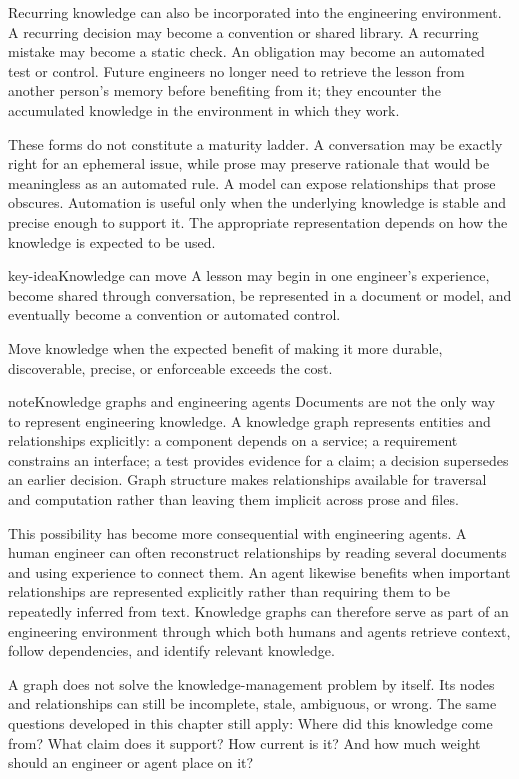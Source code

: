 Recurring knowledge can also be incorporated into the engineering environment. A recurring decision
may become a convention or shared library. A recurring mistake may become a static check. An
obligation may become an automated test or control. Future engineers no longer need to retrieve the
lesson from another person's memory before benefiting from it; they encounter the accumulated
knowledge in the environment in which they work.

These forms do not constitute a maturity ladder. A conversation may be exactly right for an
ephemeral issue, while prose may preserve rationale that would be meaningless as an automated rule.
A model can expose relationships that prose obscures. Automation is useful only when the underlying
knowledge is stable and precise enough to support it. The appropriate representation depends on how
the knowledge is expected to be used.

\begin{bookbox}{key-idea}{Knowledge can move} %
A lesson may begin in one engineer's experience, become shared through conversation, be represented
in a document or model, and eventually become a convention or automated control.

Move knowledge when the expected benefit of making it more durable, discoverable, precise, or
enforceable exceeds the cost.
\end{bookbox}

\begin{bookbox}{note}{Knowledge graphs and engineering agents} %
Documents are not the only way to represent engineering knowledge. A knowledge graph represents
entities and relationships explicitly: a component depends on a service; a requirement constrains an
interface; a test provides evidence for a claim; a decision supersedes an earlier decision. Graph
structure makes relationships available for traversal and computation rather than leaving them
implicit across prose and files.

This possibility has become more consequential with engineering agents. A human engineer can often
reconstruct relationships by reading several documents and using experience to connect them. An
agent likewise benefits when important relationships are represented explicitly rather than
requiring them to be repeatedly inferred from text. Knowledge graphs can therefore serve as part of
an engineering environment through which both humans and agents retrieve context, follow
dependencies, and identify relevant knowledge.

A graph does not solve the knowledge-management problem by itself. Its nodes and relationships can
still be incomplete, stale, ambiguous, or wrong. The same questions developed in this chapter still
apply: Where did this knowledge come from? What claim does it support? How current is it? And how
much weight should an engineer or agent place on it?
\end{bookbox}

